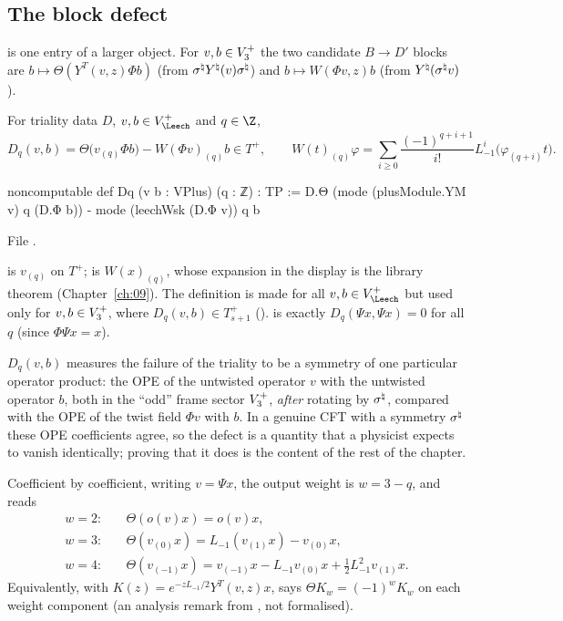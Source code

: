 \subsection{The block defect}

 is one entry of a larger object.  For $v,b\in V_3^{+}$ the two candidate $B\to D'$ blocks
are $b\mapsto\Theta(Y^T(v,z)\Phi b)$ (from $\sigma^{\natural} Y^\natural(v)\sigma^{\natural}$) and
$b\mapsto W(\Phi v,z)b$ (from $Y^\natural(\sigma^{\natural} v)$).

\begin{definition}\label{ch14:def:Dq}
For triality data $D$, $v,b\in V_\Leech^+$ and $q\in\Z$,
\begin{equation*}
  D_q(v,b)=\Theta\bigl(v_{(q)}\Phi b\bigr)-W(\Phi v)_{(q)}b\in T^+,
  \qquad
  W(t)_{(q)}\varphi=\sum_{i\ge0}\frac{(-1)^{q+i+1}}{i!}L_{-1}^i\bigl(\varphi_{(q+i)}t\bigr).
\end{equation*}
\end{definition}
\begin{leancode}
noncomputable def Dq (v b : VPlus) (q : ℤ) : TP :=
  D.Θ (mode (plusModule.YM v) q (D.Φ b)) - mode (leechWsk (D.Φ v)) q b
\end{leancode}
File .

\begin{dictionary}
 is $v_{(q)}$ on $T^+$;  is $W(x)_{(q)}$, whose
expansion in the display is the library theorem  (Chapter~\ref{ch:09}).  The
definition is made for all $v,b\in V_\Leech^+$ but used only for $v,b\in V_3^{+}$, where
$D_q(v,b)\in T_{s+1}^+$ ().   is exactly $D_q(\Psi x,\Psi x)=0$ for all $q$
(since $\Phi\Psi x=x$).
\end{dictionary}

\begin{physics}
$D_q(v,b)$ measures the failure of the triality to be a symmetry of one particular operator product:
the OPE of the untwisted operator $v$ with the untwisted operator $b$, both in the ``odd'' frame
sector $V_3^{+}$, \emph{after} rotating by $\sigma^{\natural}$, compared with the OPE of the twist field
$\Phi v$ with $b$.  In a genuine CFT with a symmetry $\sigma^{\natural}$ these OPE coefficients agree, so
the defect is a quantity that a physicist expects to vanish identically; proving that it does is
the content of the rest of the chapter.
\end{physics}

Coefficient by coefficient, writing $v=\Psi x$, the output weight is $w=3-q$, and  reads
\begin{align*}
 w=2:&\quad \Theta(o(v)x)=o(v)x,\\
 w=3:&\quad \Theta(v_{(0)}x)=L_{-1}(v_{(1)}x)-v_{(0)}x,\\
 w=4:&\quad \Theta(v_{(-1)}x)=v_{(-1)}x-L_{-1}v_{(0)}x+\tfrac12L_{-1}^2v_{(1)}x .
\end{align*}
Equivalently, with $K(z)=e^{-zL_{-1}/2}Y^T(v,z)x$,  says $\Theta K_w=(-1)^wK_w$ on each weight
component (an analysis remark from , not formalised).

